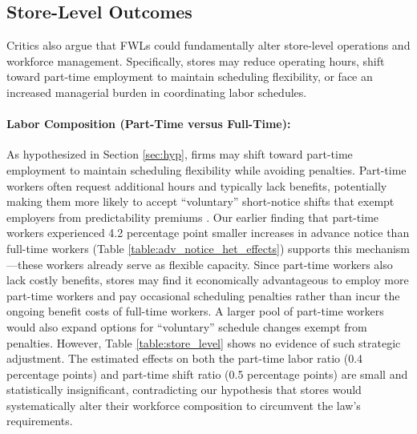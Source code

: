 \documentclass[letterpaper,11pt,leqno]{article}
\theoremstyle{paper}
\begin{document}
\subsection{Store-Level Outcomes}

Critics also argue that FWLs could fundamentally alter store-level operations and workforce management. Specifically, stores may reduce operating hours, shift toward part-time employment to maintain scheduling flexibility, or face an increased managerial burden in coordinating labor schedules. 



\paragraph{Labor Composition (Part-Time versus Full-Time):} As hypothesized in Section \ref{sec:hyp}, firms may shift toward part-time employment to maintain scheduling flexibility while avoiding penalties. Part-time workers often request additional hours and typically lack benefits, potentially making them more likely to accept ``voluntary'' short-notice shifts that exempt employers from predictability premiums \citep{kalleberg2009precarious,lambert_2008}. Our earlier finding that part-time workers experienced 4.2 percentage point smaller increases in advance notice than full-time workers (Table \ref{table:adv_notice_het_effects}) supports this mechanism—these workers already serve as flexible capacity. Since part-time workers also lack costly benefits, stores may find it economically advantageous to employ more part-time workers and pay occasional scheduling penalties rather than incur the ongoing benefit costs of full-time workers. A larger pool of part-time workers would also expand options for ``voluntary'' schedule changes exempt from penalties. However, Table \ref{table:store_level} shows no evidence of such strategic adjustment. The estimated effects on both the part-time labor ratio (0.4 percentage points) and part-time shift ratio (0.5 percentage points) are small and statistically insignificant, contradicting our hypothesis that stores would systematically alter their workforce composition to circumvent the law's requirements.
\end{document}
